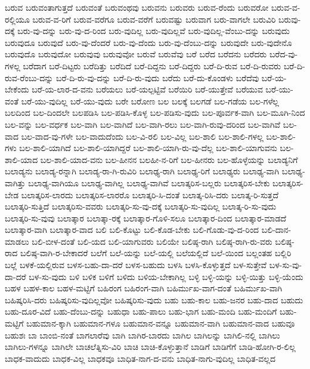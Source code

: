 {ಬರುವ
ಬರುವಂತಾಗುತ್ತದೆ
ಬರುವಂತೆ
ಬರುವಂಥವು
ಬರುವನು
ಬರುವರು
ಬರುವ-ರೆಂದು
ಬರುವರೋ
ಬರುವ-ವ-ರಲ್ಲಿಯೂ
ಬರುವ-ವ-ರಿಗೆ
ಬರುವ-ವರೆಗೂ
ಬರುವ-ವರೆಗೆ
ಬರುವಷ್ಟು
ಬರುವಾಗ
ಬರು-ವಾಗಲೇ
ಬರುವಿರಿ
ಬರುವು-ದಕ್ಕೆ
ಬರು-ವು-ದನ್ನು
ಬರು-ವು-ದ-ರಿಂದ
ಬರು-ವುದಿಲ್ಲ
ಬರು-ವುದಿಲ್ಲವೆ
ಬರು-ವುದಿಲ್ಲ-ವೆಂಬು-ದನ್ನು
ಬರುವುದು
ಬರುವುದೂ
ಬರುವುದೆ
ಬರು-ವು-ದೆಂದರೆ
ಬರು-ವು-ದೆಂದು
ಬರು-ವು-ದೆಂಬು-ದನ್ನು
ಬರುವುದೇ
ಬರು-ವುದೇನೊ
ಬರುವುದೊ
ಬರುವುದೋ
ಬರುವುವು
ಬರುವುವೋ
ಬರುವೆ
ಬರುವೆವು
ಬರೆ
ಬರೆದ
ಬರೆದನು
ಬರೆದರು
ಬರೆದ-ವು-ಗಳಲ್ಲ
ಬರೆದಾಗ
ಬರೆ-ದಿಟ್ಟರು
ಬರೆದಿತ್ತು
ಬರೆದಿದೆ
ಬರೆ-ದಿದ್ದನು
ಬರೆ-ದಿದ್ದರು
ಬರೆ-ದಿ-ರುವ
ಬರೆ-ದಿ-ರುವರು
ಬರೆ-ದಿ-ರುವ-ರೆಂಬು-ದನ್ನು
ಬರೆ-ದಿ-ರು-ವು-ದನ್ನು
ಬರೆ-ದಿ-ರು-ವುದು
ಬರೆದು
ಬರೆ-ದು-ಕೊಂಡಳು
ಬರೆದೆವು
ಬರೆ-ಯ-ಬೇಕೆಂದು
ಬರೆ-ಯ-ಲಾರ-ದ-ವನು
ಬರೆಯಲು
ಬರೆ-ಯಲ್ಪಟ್ಟಿವೆ
ಬರೆಯಿರಿ
ಬರೆ-ಯುತ್ತೇವೆ
ಬರೆಯುವ
ಬರೆ-ಯು-ವಂತೆ
ಬರೆ-ಯು-ವುದಿಲ್ಲ
ಬರೆ-ಯು-ವುದು
ಬರೇ
ಬರೋಣ
ಬಲ
ಬಲಕ್ಕೆ
ಬಲಗಡೆ
ಬಲ-ಗಡೆಯ
ಬಲ-ಗಳೆಲ್ಲ
ಬಲದಿಂದ
ಬಲ-ದಿಂದಲೇ
ಬಲಪಡಿಸಿ
ಬಲ-ಪಡಿಸಿ-ಕೊಳ್ಳ
ಬಲ-ಪಡಿಸು-ವುದು
ಬಲ-ಪೂರ್ವಕ-ವಾಗಿ
ಬಲ-ಮೂಗಿ-ನಿಂದ
ಬಲ-ವನ್ನು
ಬಲ-ವರ್ಧಕ
ಬಲ-ವಾಗಿ
ಬಲ-ವಾಗಿದೆ
ಬಲ-ವಾಗಿ-ರಲು
ಬಲ-ವಾಗಿ-ರುವು-ದರಿಂದ
ಬಲ-ವಾಗಿವೆ
ಬಲ-ವಾದ
ಬಲ-ವಾದ-ವು-ಗಳೇ
ಬಲ-ವಾದುದೆಂದು
ಬಲ-ವಿ-ರಲಿ
ಬಲ-ವಿಲ್ಲ
ಬಲ-ಶಾಲಿ
ಬಲ-ಶಾಲಿ-ಗಳಲ್ಲ
ಬಲ-ಶಾಲಿ-ಗಳು
ಬಲ-ಶಾಲಿ-ಯಾಗಿದೆ
ಬಲ-ಶಾಲಿ-ಯಾಗಿದ್ದರೆ
ಬಲ-ಶಾಲಿ-ಯಾಗಿ-ರು-ವು-ದೆಲ್ಲ
ಬಲ-ಶಾಲಿ-ಯಾಗುವನು
ಬಲ-ಶಾಲಿ-ಯಾದ
ಬಲ-ಶಾಲಿ-ಯಾದ-ವನು
ಬಲ-ಹೀನನ
ಬಲಹೀ-ನ-ರಿಗೆ
ಬಲ-ಹೀನರು
ಬಲ-ಹೊಳ್ಳೆಯನ್ನು
ಬಲಾಡ್ಯನಿಗೆ
ಬಲಾಡ್ಯನು
ಬಲಾಡ್ಯ-ರನ್ನಾಗಿ
ಬಲಾಡ್ಯ-ರಾ-ಗಿ-ರುವಿರಿ
ಬಲಾಢ್ಯ-ರಾಗಿ
ಬಲಾಢ್ಯ-ರಿಗೆ
ಬಲಾಢ್ಯರು
ಬಲಾಢ್ಯ-ವಾಗಿ
ಬಲಾಢ್ಯ-ವಾಗಿತ್ತು
ಬಲಾಢ್ಯ-ವಾಗಿಯೂ
ಬಲಾಢ್ಯ-ವಾಗಿಲ್ಲ
ಬಲಾಢ್ಯ-ವಾಗಿವೆ
ಬಲಾತ್ಕರಿಸ-ಬಲ್ಲರು
ಬಲಾತ್ಕರಿಸ-ಬೇಕು
ಬಲಾತ್ಕರಿಸ-ಬೇಡ
ಬಲಾತ್ಕರಿಸ-ಲಾರದು
ಬಲಾತ್ಕರಿಸ-ಲಾರರೊ
ಬಲಾತ್ಕರಿ-ಸಿ-ದಂತೆ
ಬಲಾತ್ಕ-ರಿಸಿ-ದರು
ಬಲಾತ್ಕ-ರಿ-ಸುತ್ತದೆ
ಬಲಾತ್ಕರಿ-ಸುತ್ತಿದೆ
ಬಲಾತ್ಕರಿಸು-ವವರು
ಬಲಾತ್ಕರಿ-ಸು-ವು-ದಕ್ಕೆ
ಬಲಾತ್ಕರಿ-ಸು-ವುದಿಲ್ಲ
ಬಲಾತ್ಕ-ರಿ-ಸು-ವುದು
ಬಲಾತ್ಕರಿ-ಸು-ವುವು
ಬಲಾತ್ಕಾರ
ಬಲಾತ್ಕಾ-ರಕ್ಕೆ
ಬಲಾತ್ಕಾರ-ಗೊಳಿ-ಸಲೂ
ಬಲಾತ್ಕಾರ-ದಿಂದ
ಬಲಾತ್ಕಾರ-ಮಾಡದೆ
ಬಲಾತ್ಕಾರ-ವಾಗಿ
ಬಲಾತ್ಕಾರ-ವಾದ
ಬಲಿ
ಬಲಿ-ಕೊಟ್ಟು
ಬಲಿ-ಕೊಡ-ಬೇಕು
ಬಲಿ-ಗೊಡು-ವು-ದ-ರಿಂದ
ಬಲಿ-ದಾನ-ಮಾಡಲು
ಬಲಿ-ಬೀಳ-ದಂತೆ
ಬಲಿ-ಯದ
ಬಲಿ-ಯಾಗುವರು
ಬಲಿಯೇ
ಬಲಿಷ್ಠ-ರಾಗಿ
ಬಲಿಷ್ಠ-ರಾಗಿ-ರು-ವರು
ಬಲಿಷ್ಠ-ರಾದ
ಬಲಿಷ್ಠ-ವಾಗಿ-ರ-ಬೇಕಾದರೆ
ಬಲೆಗೆ
ಬಲೆ-ಯನ್ನು
ಬಲೆ-ಯಲ್ಲಿ
ಬಲೆಯಲ್ಲಿದೆ
ಬಲೆ-ಯಿಂದ
ಬಲ್ಲಂತಹ
ಬಲ್ಲಿರಿ
ಬಲ್ಲೆ
ಬಳಕೆ-ಯಲ್ಲಿರುವ
ಬಳಸ-ಬಹು-ದಾ-ದರೆ
ಬಳಸ-ಬಹುದು
ಬಳಸಿ
ಬಳಸಿ-ಕೊಳ್ಳುತ್ತದೆ
ಬಳ-ಸುತ್ತೇವೆ
ಬಳ-ಸು-ವು-ದಾ-ದರೆ
ಬಳ-ಸು-ವುದು
ಬಳಿ
ಬಳಿಕ
ಬಳಿಗೆ
ಬಳಿದು
ಬಳಿಯ-ಬೇಕಾಗಿಲ್ಲ
ಬಳ್ಳಿ
ಬಳ್ಳಿ-ಯನ್ನು
ಬಳ್ಳಿ-ಯಿತ್ತು
ಬಳ್ಳಿ-ಯೆಂದು
ಬಹಳ
ಬಹಳ-ಕಾಲ
ಬಹಳ-ಮಟ್ಟಿಗೆ
ಬಹಿರಂಗ
ಬಹಿರಂಗ-ವಾಗಿ
ಬಹಿರ್ಮುಖ-ವಾಗ-ದಂತೆ
ಬಹಿರ್ಮುಖ-ವಾಗಿ
ಬಹಿಷ್ಕರಿಸಿ-ದರು
ಬಹಿಷ್ಕರಿಸು-ವುದಿಲ್ಲವೋ
ಬಹಿಷ್ಕರಿಸು-ವುದು
ಬಹು
ಬಹು-ಕಾಲ
ಬಹು-ಜನರ
ಬಹು-ದಾದ
ಬಹುದು
ಬಹು-ದೂರ-ವಿದೆ
ಬಹು-ದೆಂಬು-ದನ್ನು
ಬಹುಧಾ
ಬಹು-ಪಾಲು
ಬಹು-ಭಾಗ
ಬಹು-ಮಂದಿ
ಬಹು-ಮಂದಿಗೆ
ಬಹು-ಮಟ್ಟಿಗೆ
ಬಹುಮಾನ-ಕ್ಕಾಗಿ
ಬಹುಮಾನ-ಗಳೂ
ಬಹುಮಾನ-ವನ್ನೂ
ಬಹುಮಾನ-ವಾಗಿ
ಬಹುಮಾನ-ವಾದ
ಬಹುವೂ
ಬಹುಶಃ
ಬಾ
ಬಾಂಬಿ-ನಂತೆ
ಬಾಗಲಾರೆವು
ಬಾಗಿ
ಬಾಗಿರ-ಬಾರದು
ಬಾಗಿಲ
ಬಾಗಿಲನ್ನು
ಬಾಗಿಲಿ-ನಲ್ಲಿ
ಬಾಗಿಲು
ಬಾಗಿಲು-ಗಳನ್ನೂ
ಬಾಗಿಲೇ
ಬಾಚಲೆತ್ನಿಸು-ವಿರಿ
ಬಾಚಿ
ಬಾಚಿ-ಕೊಳ್ಳುತ್ತಾನೆ
ಬಾಡಿಗೆ
ಬಾಡಿಗೆಗೆ
ಬಾಡಿ-ಹೋಗಿ-ರ-ಲಿಲ್ಲ
ಬಾಧಕ-ವಾದುದು
ಬಾಧಕ-ವಿಲ್ಲ
ಬಾಧಕವೂ
ಬಾಧಿತ-ನಾಗ-ದ-ವನು
ಬಾಧಿತ-ನಾಗು-ವುದಿಲ್ಲ
ಬಾಧಿತ-ವಲ್ಲದ
}
